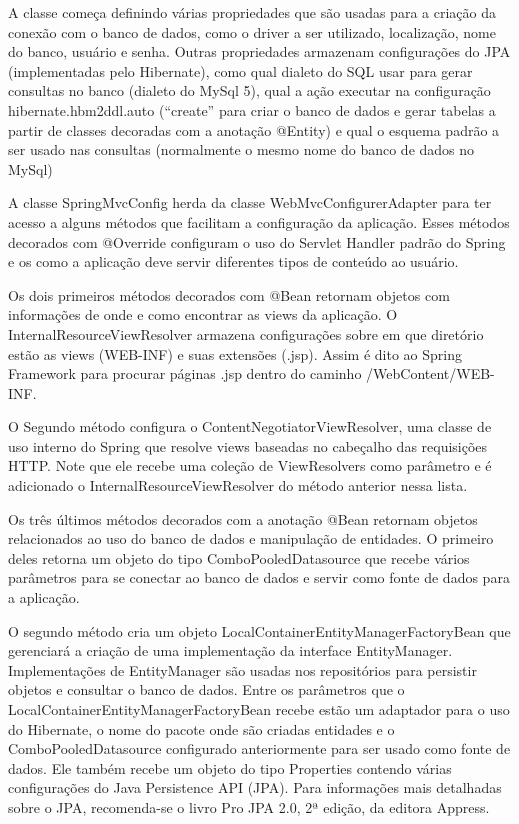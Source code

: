 \documentclass[a4paper,12pt]{article}
\newcommand{\javacode}[3] {
	
	\FloatBarrier
}
\begin{document}
\javacode{code/mvcconfig.txt}{Classe SpringMvcConfig}{lst:mvcconfig}

A classe começa definindo várias propriedades que são usadas para a criação da conexão com o banco de dados, como o driver a ser utilizado, localização, nome do banco, usuário e senha. Outras propriedades armazenam configurações do JPA (implementadas pelo Hibernate), como qual dialeto do SQL usar para gerar consultas no banco (dialeto do MySql 5), qual a ação executar na configuração hibernate.hbm2ddl.auto (“create” para criar o banco de dados e gerar tabelas a partir de classes decoradas com a anotação @Entity) e qual o esquema padrão a ser usado nas consultas (normalmente o mesmo nome do banco de dados no MySql)

A classe SpringMvcConfig herda da classe WebMvcConfigurerAdapter para ter acesso a alguns métodos que facilitam a configuração da aplicação. Esses métodos decorados com @Override configuram o uso do Servlet Handler padrão do Spring e os como a aplicação deve servir diferentes tipos de conteúdo ao usuário.

Os dois primeiros métodos decorados com @Bean retornam objetos com informações de onde e como encontrar as views da aplicação. O InternalResourceViewResolver armazena configurações sobre em que diretório estão as views (WEB-INF) e suas extensões (.jsp). Assim é dito ao Spring Framework para procurar páginas .jsp dentro do caminho /WebContent/WEB-INF.

O Segundo método configura o ContentNegotiatorViewResolver, uma classe de uso interno do Spring que resolve views baseadas no cabeçalho das requisições HTTP. Note que ele recebe uma coleção de ViewResolvers como parâmetro e é adicionado o InternalResourceViewResolver do método anterior nessa lista.

Os três últimos métodos decorados com a anotação @Bean retornam objetos relacionados ao uso do banco de dados e manipulação de entidades. O primeiro deles retorna um objeto do tipo ComboPooledDatasource que recebe vários parâmetros para se conectar ao banco de dados e servir como fonte de dados para a aplicação. 

O segundo método cria um objeto LocalContainerEntityManagerFactoryBean que gerenciará a criação de uma implementação da interface EntityManager. Implementações de EntityManager são usadas nos repositórios para persistir objetos e consultar o banco de dados. Entre os parâmetros que o LocalContainerEntityManagerFactoryBean recebe estão um adaptador para o uso do Hibernate, o nome do pacote onde são criadas entidades e o ComboPooledDatasource configurado anteriormente para ser usado como fonte de dados. Ele também recebe um objeto do tipo Properties contendo várias configurações do Java Persistence API (JPA). Para informações mais detalhadas sobre o JPA, recomenda-se o livro Pro JPA 2.0, 2ª edição, da editora Appress.
\end{document}

